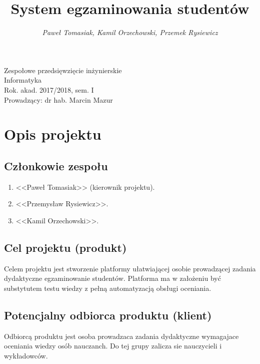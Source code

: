 \documentclass[a4paper]{article}
\title{\bf{System egzaminowania studentów}}
\author{{\em Paweł Tomasiak, Kamil Orzechowski, Przemek Rysiewicz}}
\date{}
\begin{document}
\begin{titlepage}
\maketitle
\thispagestyle{empty}
\bigskip
\begin{center}
Zespołowe przedsięwzięcie inżynierskie\\[2mm]

Informatyka\\[2mm]

Rok. akad. 2017/2018, sem. I\\[2mm]

Prowadzący: dr hab. Marcin Mazur
\end{center}
\end{titlepage}

\tableofcontents
\thispagestyle{empty}

\newpage

\section{Opis projektu}

\subsection{Członkowie zespołu}

\begin{enumerate}
\item <<Paweł Tomasiak>> (kierownik projektu).
\item <<Przemysław Rysiewicz>>.
\item <<Kamil Orzechowski>>.
\end{enumerate}

\subsection{Cel projektu (produkt)}

Celem projektu jest stworzenie platformy ułatwiającej osobie prowadzącej zadania dydaktyczne egzaminowanie studentów. Platforma ma w założeniu być substytutem testu wiedzy z pełną automatyzacją obsługi oceniania.

\subsection{Potencjalny odbiorca produktu (klient)}

Odbiorcą produktu jest osoba prowadzaca zadania dydaktyczne wymagajace oceniania wiedzy osób nauczanch. Do tej grupy zalicza sie nauczycieli i wykładowców.
\end{document}
